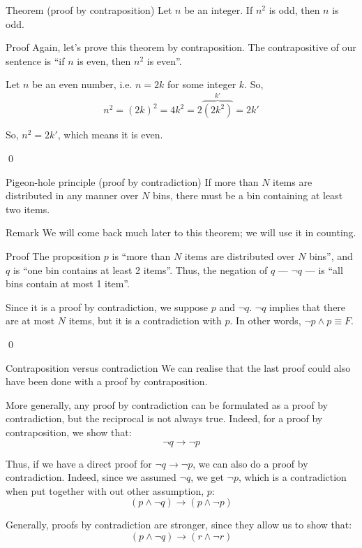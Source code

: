\documentclass{article}
\begin{document}
\begin{parag}{Theorem (proof by contraposition)}
    Let $n$ be an integer. If $n^2$ is odd, then $n$ is odd.

    \begin{subparag}{Proof}
        Again, let's prove this theorem by contraposition. The contrapositive of our sentence is ``if $n$ is even, then $n^2$ is even''.

        Let $n$ be an even number, i.e. $n = 2k$ for some integer $k$. So, 
        \[n^2 = \left(2k\right)^2 = 4k^2 = 2\overbrace{\left(2k^2\right)}^{k'} = 2k'\]
        
        So, $n^2 = 2k'$, which means it is even.

        \qed
    \end{subparag}
\end{parag}


\begin{parag}{Pigeon-hole principle (proof by contradiction)}
    If more than $N$ items are distributed in any manner over $N$ bins, there must be a bin containing at least two items.
    
    \begin{subparag}{Remark}
        We will come back much later to this theorem; we will use it in counting.
    \end{subparag}

    \begin{subparag}{Proof}
        The proposition $p$ is ``more than $N$ items are distributed over $N$ bins'', and $q$ is ``one bin contains at least 2 items''. Thus, the negation of $q$ --- $\lnot q$ --- is ``all bins contain at most 1 item''. 

        Since it is a proof by contradiction, we suppose $p$ and $\lnot q$. $\lnot q$ implies that there are at most $N$ items, but it is a contradiction with $p$. In other words, $\lnot p \land p \equiv F$. 

        \qed
    \end{subparag}
\end{parag}

\begin{parag}{Contraposition versus contradiction}
    We can realise that the last proof could also have been done with a proof by contraposition.

    More generally, any proof by contradiction can be formulated as a proof by contradiction, but the reciprocal is not always true. Indeed, for a proof by contraposition, we show that: 
    \[\lnot q \to \lnot p\]
    
    Thus, if we have a direct proof for $\lnot q \to \lnot p$, we can also do a proof by contradiction. Indeed, since we assumed $\lnot q$, we get $\lnot p$, which is a contradiction when put together with out other assumption, $p$: 
    \[\left(p \land \lnot q\right) \to \left(p \land\lnot p\right)\]
    
    Generally, proofs by contradiction are stronger, since they allow us to show that: 
    \[\left(p \land\lnot q\right) \to \left(r \land\lnot r\right)\]
\end{parag}
\end{document}

